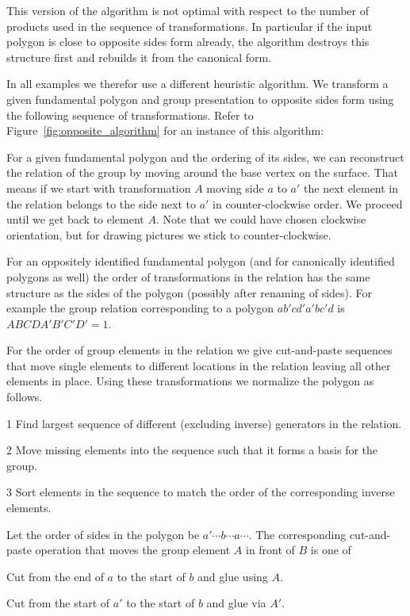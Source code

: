 \documentclass[Thesis]{subfiles}
\begin{document}
This version of the algorithm is not optimal with respect to the number of products used in the sequence of transformations. In particular if the input polygon is close to opposite sides form already, the algorithm destroys this structure first and rebuilds it from the canonical form.

In all examples we therefor use a different heuristic algorithm. We transform a given fundamental polygon and group presentation to opposite sides form using the following sequence of transformations. Refer to Figure~\ref{fig:opposite_algorithm} for an instance of this algorithm:

For a given fundamental polygon and the ordering of its sides, we can reconstruct the relation of the group by moving around the base vertex on the surface. That means if we start with transformation $A$ moving side $a$ to $a'$ the next element in the relation belongs to the side next to $a'$ in counter-clockwise order. We proceed until we get back to element $A$. Note that we could have chosen clockwise orientation, but for drawing pictures we stick to counter-clockwise.

For an oppositely identified fundamental polygon (and for canonically identified polygons as well) the order of transformations in the relation has the same structure as the sides of the polygon (possibly after renaming of sides). For example the group relation corresponding to a polygon $ab'cd'a'bc'd$ is $ABCDA'B'C'D'=1$.

For the order of group elements in the relation we give cut-and-paste sequences that move single elements to different locations in the relation leaving all other elements in place. Using these transformations we normalize the polygon as follows.

\begin{compactitem}
\item[1] Find largest sequence of different (excluding inverse) generators in the relation.
\item[2] Move missing elements into the sequence such that it forms a basis for the group.
\item[3] Sort elements in the sequence to match the order of the corresponding inverse elements.
\end{compactitem}

Let the order of sides in the polygon be $a' \cdots b \cdots a \cdots$. The corresponding cut-and-paste operation that moves the group element $A$ in front of $B$ is one of

\begin{compactitem}
\item Cut from the end of $a$ to the start of $b$ and glue using $A$.
\item Cut from the start of $a'$ to the start of $b$ and glue via $A'$.
\end{compactitem}
\end{document}
